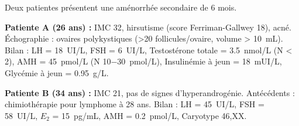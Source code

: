 \documentclass[11pt]{article}
\begin{document}
\begin{exercice}
Deux patientes présentent une aménorrhée secondaire de 6 mois.

\textbf{Patiente A (26 ans) :} IMC 32, hirsutisme (score Ferriman-Gallwey 18), acné. Échographie : ovaires polykystiques (>20 follicules/ovaire, volume > \SI{10}{mL}). Bilan : LH = \SI{18}{UI/L}, FSH = \SI{6}{UI/L}, Testostérone totale = \SI{3,5}{nmol/L} (N < 2), AMH = \SI{45}{pmol/L} (N \SI{10-30}{pmol/L}), Insulinémie à jeun = \SI{18}{mUI/L}, Glycémie à jeun = \SI{0,95}{g/L}.

\textbf{Patiente B (34 ans) :} IMC 21, pas de signes d'hyperandrogénie. Antécédents : chimiothérapie pour lymphome à 28 ans. Bilan : LH = \SI{45}{UI/L}, FSH = \SI{58}{UI/L}, $E_2$ = \SI{15}{pg/mL}, AMH = \SI{0,2}{pmol/L}, Caryotype 46,XX.


\end{exercice}
\end{document}
